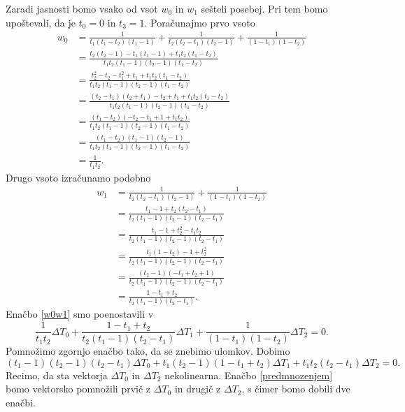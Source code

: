 \documentclass[mat1]{fmfdelo}
\newcommand{\de}{\Delta}
\begin{document}
%
Zaradi jasnosti bomo vsako od vsot $w_0$ in $w_1$ sešteli posebej. Pri tem bomo upo\-šte\-va\-li, da je $t_0 = 0$ in $t_3 = 1$. Poračunajmo prvo vsoto
%
\begin{align*}
w_0 &= \frac{1}{t_1(t_1 - t_2)(t_1 - 1)} + \frac{1}{t_2(t_2 - t_1)(t_2 - 1)} + \frac{1}{(1-t_1)(1-t_2)} \\
       &= \frac{t_2(t_2 - 1) - t_1(t_1 - 1) + t_1 t_2(t_1 - t_2)}{t_1 t_2(t_1 - 1)(t_2 - 1)(t_1 - t_2)} \\
       &= \frac{t_2^2 - t_2 - t_1^2 + t_1 + t_1 t_2(t_1 - t_2)}{t_1 t_2(t_1 - 1)(t_2 - 1)(t_1 - t_2)} \\
       &= \frac{(t_2 - t_1)(t_2 + t_1) - t_2 + t_1 + t_1 t_2(t_1 - t_2)}{t_1 t_2(t_1 - 1)(t_2 - 1)(t_1 - t_2)} \\
       &= \frac{(t_1 - t_2)(-t_2 - t_1 + 1 + t_1 t_2)}{t_1 t_2(t_1 - 1)(t_2 - 1)(t_1 - t_2)} \\
       &= \frac{(t_1 - t_2)(t_1 - 1)(t_2 - 1)}{t_1 t_2(t_1 - 1)(t_2 - 1)(t_1 - t_2)} \\
       & = \frac{1}{t_1 t_2} . 
\end{align*}
%
Drugo vsoto izračunamo podobno
%
\begin{align*}
w_1 &= \frac{1}{t_2(t_2 - t_1)(t_2 - 1)} + \frac{1}{(1-t_1)(1-t_2)} \\
       &= \frac{t_1 - 1 + t_2(t_2 - t_1)}{t_2(t_1 - 1)(t_2 - 1)(t_2 - t_1)} \\
       &= \frac{t_1 - 1 + t_2^2 - t_1 t_2}{t_2(t_1 - 1)(t_2 - 1)(t_2 - t_1)} \\
       &= \frac{t_1(1 - t_2) - 1 + t_2^2 }{t_2(t_1 - 1)(t_2 - 1)(t_2 - t_1)} \\
       &= \frac{(t_2 - 1)(-t_1 + t_2 + 1)}{t_2(t_1 - 1)(t_2 - 1)(t_2 - t_1)} \\
       &= \frac{1 - t_1 + t_2}{t_2(t_1 - 1)(t_2 - t_1)}
       . 
\end{align*}
%
Enačbo \eqref{w0w1} smo poenostavili v 
%
\begin{equation*}
\frac{1}{t_1 t_2} \de T_0 + \frac{1 - t_1 + t_2}{t_2(t_1 - 1)(t_2 - t_1)} \de T_1 + \frac{1}{(1 - t_1)(1 - t_2)} \de T_2 = 0.
\end{equation*}
%
Pomnožimo zgornjo enačbo tako, da se znebimo ulomkov. Dobimo
%
\begin{equation}\label{predmnozenjem}
(t_1 - 1)(t_2 - 1)(t_2 - t_1) \de T_0 + t_1(t_2 - 1)(1 - t_1 + t_2) \de T_1 + t_1 t_2 (t_2 - t_1) \de T_2 = 0.
\end{equation}
%
Recimo, da sta vektorja $\de T_0$ in $\de T_2$ nekolinearna. Enačbo \eqref{predmnozenjem} bomo vektorsko pomnožili prvič z $\de T_0$ in drugič z $\de T_2$, s čimer bomo dobili dve enačbi. 
\end{document}
